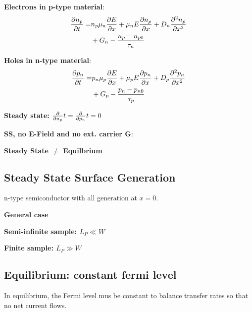 \documentclass[a4paper, fontsize=8pt, landscape, DIV=1]{scrartcl}
\begin{document}
\begin{multicols*}{4}
\textbf{Electrons in p-type material}:
\begin{align*}
\frac{\partial n_p}{\partial t} =& n_p\mu_n\frac{\partial{E}}{\partial x}+\mu_n{E}\frac{\partial n_p}{\partial x} + D_n\frac{\partial^2n_p}{\partial x^2} \\ &+ G_n - \frac{n_p-n_{p0}}{\tau_n}
\end{align*}

\textbf{Holes in n-type material}:
\begin{align*}
\frac{\partial p_n}{\partial t} =& p_n\mu_p\frac{\partial{E}}{\partial x}+\mu_p{E}\frac{\partial p_n}{\partial x} + D_p\frac{\partial^2p_n}{\partial x^2} \\ &+ G_p - \frac{p_n-p_{n0}}{\tau_p}
\end{align*}

\textbf{Steady state: $\frac{\partial}{\partial n_p}{t}=\frac{\partial}{\partial p_n}{t}=0$}

\textbf{SS, no E-Field and no ext. carrier G}:

\begin{center}
\attention \textbf{Steady State $\neq$ Equilbrium} \attention
\end{center}

\subsection{Steady State Surface Generation}
n-type semiconductor with all generation at $x=0$.

\textbf{General case}

\textbf{Semi-infinite sample: $L_P \ll W$}
    
\textbf{Finite sample:  $L_P \gg W$}

\subsection{Equilibrium: constant fermi level}
In equilibrium, the Fermi level mus be constant to balance transfer rates so that no net current flows.


\end{multicols*}
\end{document}
